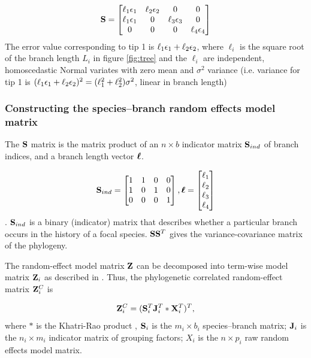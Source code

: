 \documentclass[12pt]{article}
\begin{document}
\begin{align*}
{\mathbf S} = \begin{bmatrix}
\ell_1 { \epsilon}_1 & \ell_2 { \epsilon}_2 & 0 & 0 \\
\ell_1 { \epsilon}_1 &  0 & \ell_3 { \epsilon}_3 & 0 \\
0  &  0 & 0  & \ell_4 { \epsilon}_4
\end{bmatrix}
\end{align*}
The error value corresponding to tip 1 is $\ell_1 { \epsilon}_1 + \ell_2 { \epsilon}_2$, where $\ell_i$ is the square root of the branch length $L_i$ in figure \ref{fig:tree} and the $\ell_i$ are independent, homoscedastic Normal variates with zero mean and $\sigma^2$ variance (i.e. variance for tip 1 is $(\ell_1 { \epsilon}_1 + \ell_2 { \epsilon}_2)^2 = (\ell_1^2 + \ell_2^2)\sigma^2$, linear in branch length) 

\subsubsection*{Constructing the species--branch random effects model matrix}

The ${\mathbf S}$ matrix is the matrix product of an $n \times b$ indicator matrix ${\mathbf S}_{ind}$ of branch indices, and a branch length vector ${\boldsymbol \ell}$.

\begin{align}
{\mathbf S}_{ind} = \begin{bmatrix}
1 & 1 & 0 & 0 \\ 
1 & 0 & 1 & 0 \\ 
0 & 0 & 0 & 1
\end{bmatrix} , 
{\boldsymbol \ell} = \begin{bmatrix}
\ell_1 \\
\ell_2 \\
\ell_3 \\
\ell_4 
\end{bmatrix}
\label{eq:S}
\end{align}.
${\mathbf S}_{ind}$ is a binary (indicator) matrix that describes whether a particular branch occurs in the history of a focal species. 
${\mathbf S} {\mathbf S}^T$ gives the variance-covariance matrix of the phylogeny. 

The random-effect model matrix ${\mathbf Z}$ can be decomposed into term-wise model matrix ${\mathbf Z}_{i}$ as described in \citet{bates2015fitting}.
Thus, the phylogenetic correlated random-effect matrix ${\mathbf Z}^{C}_{i}$ is

\begin{equation}
{\mathbf Z}^{C}_{i} = ({\mathbf S}^{T}_{i}{\mathbf J}^{T}_{i} \ast {\mathbf X}^{T}_{i})^{T}, \label{eq:ZC}
\end{equation}
where $\ast$ is the Khatri-Rao product \citep{khatri1968solutions}, ${\mathbf S}_{i}$ is the $m_{i} \times b_{i}$ species--branch matrix; ${\mathbf J}_{i}$ is the $n_i \times m_i$ indicator matrix of grouping factors; $X_{i}$ is the $n \times p_{i}$ raw random effects model matrix. 
\end{document}
